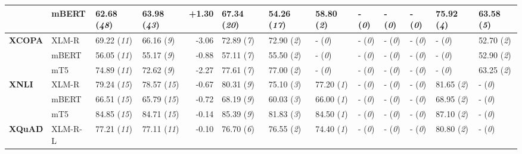 \begin{tabular}{ll||llr|llllllll}
	 & mBERT & 62.68 (\textit{48}) & 63.98 (\textit{43}) & +1.30 & \cellcolor{high-color!40}  67.34 (\textit{20}) &  54.26 (\textit{17}) & \cellcolor{low-color!40}  58.80 (\textit{2}) & - (\textit{0}) & - (\textit{0}) & - (\textit{0}) &  75.92 (\textit{4}) &  63.58 (\textit{5}) \\\midrule
	\multirow{3}{*}{\textbf{XCOPA}\acc} & XLM-R & 69.22 (\textit{11}) & 66.16 (\textit{9}) & -3.06 & \cellcolor{high-color!40}  72.89 (\textit{7}) & \cellcolor{low-color!40}  72.90 (\textit{2}) & - (\textit{0}) & - (\textit{0}) & - (\textit{0}) & - (\textit{0}) & - (\textit{0}) & \cellcolor{low-color!40}  52.70 (\textit{2}) \\
	 & mBERT & 56.05 (\textit{11}) & 55.17 (\textit{9}) & -0.88 & \cellcolor{high-color!40}  57.11 (\textit{7}) & \cellcolor{low-color!40}  55.50 (\textit{2}) & - (\textit{0}) & - (\textit{0}) & - (\textit{0}) & - (\textit{0}) & - (\textit{0}) & \cellcolor{low-color!40}  52.90 (\textit{2}) \\
	 & mT5 & 74.89 (\textit{11}) & 72.62 (\textit{9}) & -2.27 & \cellcolor{high-color!40}  77.61 (\textit{7}) & \cellcolor{low-color!40}  77.00 (\textit{2}) & - (\textit{0}) & - (\textit{0}) & - (\textit{0}) & - (\textit{0}) & - (\textit{0}) & \cellcolor{low-color!40}  63.25 (\textit{2}) \\\midrule
	\multirow{3}{*}{\textbf{XNLI}\acc} & XLM-R & 79.24 (\textit{15}) & 78.57 (\textit{15}) & -0.67 & \cellcolor{high-color!40}  80.31 (\textit{9}) &  75.10 (\textit{3}) & \cellcolor{low-color!40}  77.20 (\textit{1}) & - (\textit{0}) & - (\textit{0}) & - (\textit{0}) &  81.65 (\textit{2}) & - (\textit{0}) \\
	 & mBERT & 66.51 (\textit{15}) & 65.79 (\textit{15}) & -0.72 & \cellcolor{high-color!40}  68.19 (\textit{9}) &  60.03 (\textit{3}) & \cellcolor{low-color!40}  66.00 (\textit{1}) & - (\textit{0}) & - (\textit{0}) & - (\textit{0}) &  68.95 (\textit{2}) & - (\textit{0}) \\
	 & mT5 & 84.85 (\textit{15}) & 84.71 (\textit{15}) & -0.14 & \cellcolor{high-color!40}  85.39 (\textit{9}) &  81.83 (\textit{3}) & \cellcolor{low-color!40}  84.50 (\textit{1}) & - (\textit{0}) & - (\textit{0}) & - (\textit{0}) &  87.10 (\textit{2}) & - (\textit{0}) \\\midrule
	\multirow{3}{*}{\textbf{XQuAD}\f} & XLM-R-L & 77.21 (\textit{11}) & 77.11 (\textit{11}) & -0.10 & \cellcolor{high-color!40}  76.70 (\textit{6}) &  76.55 (\textit{2}) & \cellcolor{low-color!40}  74.40 (\textit{1}) & - (\textit{0}) & - (\textit{0}) & - (\textit{0}) &  80.80 (\textit{2}) & - (\textit{0}) \\

\end{tabular}
